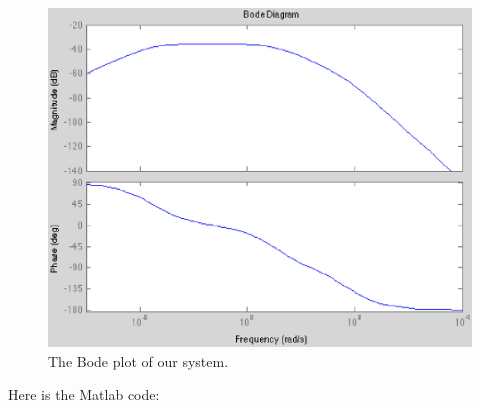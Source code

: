 \documentclass{notes}
\begin{document}
\begin{figure}[!h]
  \begin{center}
    \includegraphics[width=4.5 in]{pics/performance_measurements/bode_plot.eps}
  \end{center}
  \caption{The Bode plot of our system.}
  \label{fig:bode_plot}
\end{figure}
\newpage
Here is the Matlab code:
\end{document}
